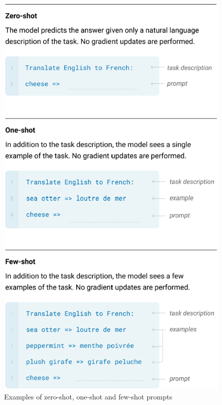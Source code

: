 \documentclass[fleqn,moreauthors,10pt]{ds_report}
\begin{document}
\begin{figure}[!h]\centering
	\includegraphics[width=\linewidth]{fig/few-shot-new.png}
	\caption{Examples of zero-shot, one-shot and few-shot prompts}
	\label{fig:few-shot}
\end{figure}
\end{document}
